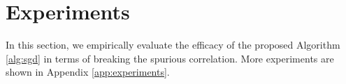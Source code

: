 \documentclass{article} %
\newcommand{\btheta}{\text{\boldmath{$\theta$}}}
\newcommand{\bx}{\boldsymbol{x}}
\newcommand{\bF}{\boldsymbol{F}}
\newcommand{\cL}{\mathcal{L}}
\begin{document}
	\section{Experiments}\label{sec:experiments}
	In this section, we empirically evaluate the efficacy of the proposed Algorithm \ref{alg:sgd} in terms of breaking the spurious correlation. More experiments are shown in Appendix \ref{app:experiments}. 
	
\end{document}
